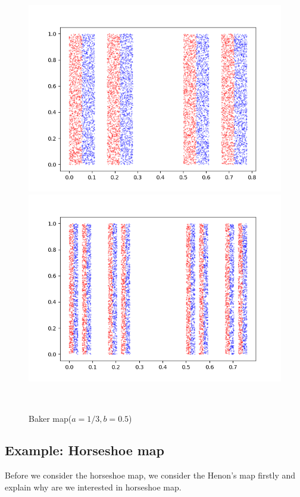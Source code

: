 \documentclass[12pt]{article}
\theoremstyle{plain}
\begin{document}
\begin{figure}[H]
\begin{minipage}[c][0.24\width]{
   0.24\textwidth}
   \includegraphics[width=1\textwidth]{figure/section5/baker-2-0*33-0*5.png}
\end{minipage}
\begin{minipage}[c][0.24\width]{
   0.24\textwidth}
   \centering
   \includegraphics[width=1\textwidth]{figure/section5/baker-3-0*33-0*5.png}
\end{minipage}
\\[2ex]\caption{Baker map($a = 1/3, b = 0.5$)}
\end{figure}



\subsection{Example: Horseshoe map}
Before we consider the horseshoe map, we consider the Henon's map firstly and explain why are we interested in horseshoe map.
\end{document}
